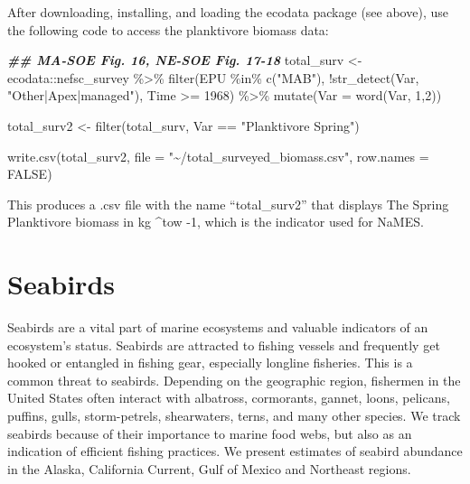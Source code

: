 \documentclass[
]{book}
\newenvironment{Shaded}{\begin{snugshade}}{\end{snugshade}}
\newcommand{\AttributeTok}[1]{\textcolor[rgb]{0.77,0.63,0.00}{#1}}
\newcommand{\ConstantTok}[1]{\textcolor[rgb]{0.00,0.00,0.00}{#1}}
\newcommand{\DecValTok}[1]{\textcolor[rgb]{0.00,0.00,0.81}{#1}}
\newcommand{\DocumentationTok}[1]{\textcolor[rgb]{0.56,0.35,0.01}{\textbf{\textit{#1}}}}
\newcommand{\FunctionTok}[1]{\textcolor[rgb]{0.00,0.00,0.00}{#1}}
\newcommand{\NormalTok}[1]{#1}
\newcommand{\OtherTok}[1]{\textcolor[rgb]{0.56,0.35,0.01}{#1}}
\newcommand{\SpecialCharTok}[1]{\textcolor[rgb]{0.00,0.00,0.00}{#1}}
\newcommand{\StringTok}[1]{\textcolor[rgb]{0.31,0.60,0.02}{#1}}
\begin{document}
After downloading, installing, and loading the ecodata package (see above), use the following code to access the planktivore biomass data:

\begin{Shaded}
\begin{Highlighting}[]
\DocumentationTok{\#\# MA{-}SOE Fig. 16, NE{-}SOE Fig. 17{-}18}
\NormalTok{total\_surv }\OtherTok{\textless{}{-}}\NormalTok{ ecodata}\SpecialCharTok{::}\NormalTok{nefsc\_survey }\SpecialCharTok{\%\textgreater{}\%}
  \FunctionTok{filter}\NormalTok{(EPU }\SpecialCharTok{\%in\%} \FunctionTok{c}\NormalTok{(}\StringTok{"MAB"}\NormalTok{),}
         \SpecialCharTok{!}\FunctionTok{str\_detect}\NormalTok{(Var, }\StringTok{"Other|Apex|managed"}\NormalTok{),}
\NormalTok{         Time }\SpecialCharTok{\textgreater{}=} \DecValTok{1968}\NormalTok{) }\SpecialCharTok{\%\textgreater{}\%}
  \FunctionTok{mutate}\NormalTok{(}\AttributeTok{Var =} \FunctionTok{word}\NormalTok{(Var, }\DecValTok{1}\NormalTok{,}\DecValTok{2}\NormalTok{))}

\NormalTok{total\_surv2 }\OtherTok{\textless{}{-}} \FunctionTok{filter}\NormalTok{(total\_surv, Var }\SpecialCharTok{==} \StringTok{"Planktivore Spring"}\NormalTok{)}

\FunctionTok{write.csv}\NormalTok{(total\_surv2, }\AttributeTok{file =} \StringTok{"\textasciitilde{}/total\_surveyed\_biomass.csv"}\NormalTok{, }\AttributeTok{row.names =} \ConstantTok{FALSE}\NormalTok{)}
\end{Highlighting}
\end{Shaded}

This produces a .csv file with the name ``total\_surv2'' that displays The Spring Planktivore biomass in kg \^{}tow -1, which is the indicator used for NaMES.

\hypertarget{seabirds}{%
\chapter{Seabirds}\label{seabirds}}

Seabirds are a vital part of marine ecosystems and valuable indicators of an ecosystem's status. Seabirds are attracted to fishing vessels and frequently get hooked or entangled in fishing gear, especially longline fisheries. This is a common threat to seabirds. Depending on the geographic region, fishermen in the United States often interact with albatross, cormorants, gannet, loons, pelicans, puffins, gulls, storm-petrels, shearwaters, terns, and many other species. We track seabirds because of their importance to marine food webs, but also as an indication of efficient fishing practices. We present estimates of seabird abundance in the Alaska, California Current, Gulf of Mexico and Northeast regions.
\end{document}
